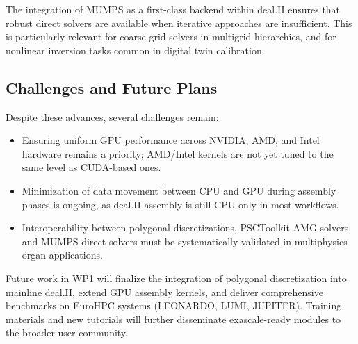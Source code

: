 \documentclass[a4paper,12pt]{article}
\begin{document}
The integration of MUMPS as a first-class backend within deal.II ensures that
robust direct solvers are available when iterative approaches are insufficient.
This is particularly relevant for coarse-grid solvers in multigrid hierarchies,
and for nonlinear inversion tasks common in digital twin calibration.

\subsection{Challenges and Future Plans}

Despite these advances, several challenges remain:

\begin{itemize}
  \item Ensuring uniform GPU performance across NVIDIA, AMD, and Intel hardware
        remains a priority; AMD/Intel kernels are not yet tuned to the same
        level as CUDA-based ones.
  \item Minimization of data movement between CPU and GPU during assembly phases
        is ongoing, as deal.II assembly is still CPU-only in most workflows.
  \item Interoperability between polygonal discretizations, PSCToolkit AMG
        solvers, and MUMPS direct solvers must be systematically validated in
        multiphysics organ applications.
\end{itemize}

Future work in WP1 will finalize the integration of polygonal discretization
into mainline deal.II, extend GPU assembly kernels, and deliver comprehensive
benchmarks on EuroHPC systems (LEONARDO, LUMI, JUPITER). Training materials and
new tutorials will further disseminate exascale-ready modules to the broader
user community.

\label{MyLastPage}
\end{document}
